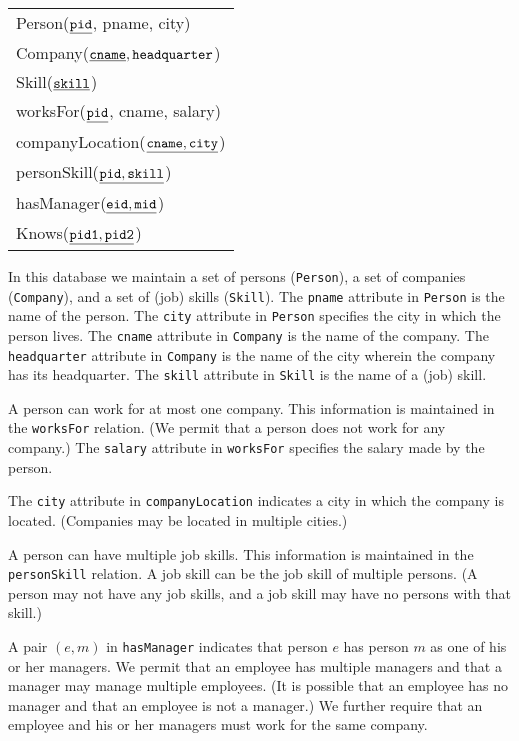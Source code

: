 \documentclass[11pt]{article}
\begin{document}
\begin{center}
{\tt
  \begin{tabular}{l}
  {Person}($\underline{\tt pid}$, pname, city) \\
  {Company}($\underline{\tt cname}, {\tt headquarter}$) \\
  {Skill}($\underline{\tt skill}$) \\
  {worksFor}($\underline{\tt pid}$, cname, salary) \\
  {companyLocation}($\underline{\tt cname, city}$) \\
  {personSkill}($\underline{\tt pid, skill}$) \\
  {hasManager}($\underline{\tt eid, mid}$) \\
  {Knows}($\underline{\tt pid1, pid2}$) \\
   \end{tabular}
  }
\end{center}

In this database we maintain a set of persons ({\tt Person}), a set
of companies ({\tt Company}), and a set of (job) skills ({\tt Skill}).  
The {\tt pname} attribute in {\tt Person} is the name of the person.  
The {\tt city} attribute in {\tt Person} specifies the city in which the person lives.  
The {\tt cname} attribute in {\tt Company} is the name of the company.
The {\tt headquarter} attribute in {\tt Company} is the name of the city wherein the company has its headquarter.
The {\tt skill} attribute in {\tt Skill} is the name of a (job) skill.

A person can work for at most one company. This information is maintained in the {\tt worksFor} relation. (We permit that a person does not work for any company.)
The {\tt salary} attribute in {\tt worksFor} specifies the salary made by the person.

The {\tt city} attribute in {\tt companyLocation} indicates a city in which the company is located.
(Companies may be located in multiple cities.)

A person can have multiple job skills. This information is maintained in the {\tt personSkill} relation.  A job skill can be
the job skill of multiple persons.  (A person may not have any job skills, and a job skill may
have no persons with that skill.)

A pair $(e,m)$ in {\tt hasManager} indicates that person $e$ has  
person $m$ as one of his or her managers.
We permit that an employee has multiple managers and that a manager  may manage
multiple employees.  (It is possible that an employee has no manager
and that an employee is not a manager.)
We further require that 
an employee and his or her managers must work for the
same company.
\end{document}
